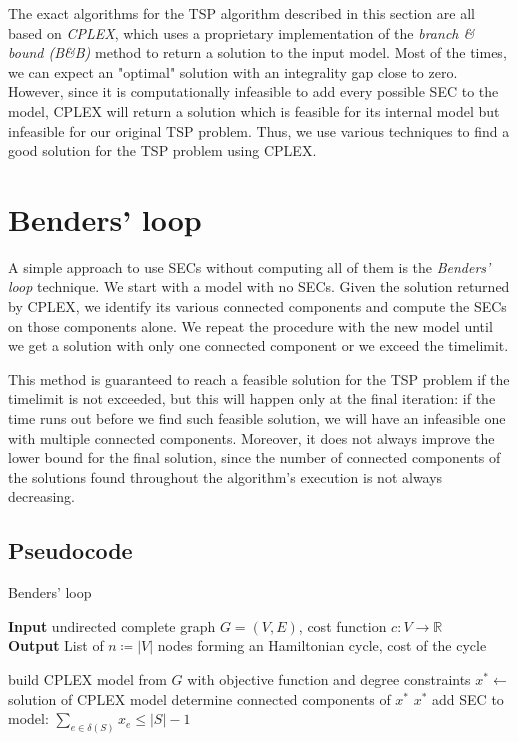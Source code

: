 The exact algorithms for the TSP algorithm described in this section are all based on \textit{CPLEX}, which uses a proprietary implementation of the \textit{branch \& bound (B\&B)} method to return a solution to the input model. Most of the times, we can expect an "optimal" solution with an integrality gap close to zero. However, since it is computationally infeasible to add every possible SEC to the model, CPLEX will return a solution which is feasible for its internal model but infeasible for our original TSP problem. Thus, we use various techniques to find a good solution for the TSP problem using CPLEX.

\section{Benders' loop}
A simple approach to use SECs without computing all of them is the \textit{Benders' loop} technique. We start with a model with no SECs. Given the solution returned by CPLEX, we identify its various connected components and compute the SECs on those components alone. We repeat the procedure with the new model until we get a solution with only one connected component or we exceed the timelimit.

This method is guaranteed to reach a feasible solution for the TSP problem if the timelimit is not exceeded, but this will happen only at the final iteration: if the time runs out before we find such feasible solution, we will have an infeasible one with multiple connected components. Moreover, it does not always improve the lower bound for the final solution, since the number of connected components of the solutions found throughout the algorithm's execution is not always decreasing.
\newpage
\FloatBarrier
\subsection{Pseudocode}
\begin{algorithm}[h]
    \caption{Benders' loop}
    \hspace*{\algorithmicindent} \textbf{Input} undirected complete graph $G=(V,E)$, cost function $c:V\rightarrow\mathbb{R}$\\
    \hspace*{\algorithmicindent} \textbf{Output} List of $n\coloneq|V|$ nodes forming an Hamiltonian cycle, cost of the cycle\\
    \begin{algorithmic}

        \State build CPLEX model from $G$ with objective function and degree constraints
        \State $x^* \gets$ solution of CPLEX model
        \State determine connected components of $x^*$
        \Return $x^*$
        \EndIf
        \State add SEC to model: $\sum_{e\in\delta(S)}x_e\leq|S|-1$
        \EndFor
        \EndWhile

    \end{algorithmic}
\end{algorithm}
\FloatBarrier

